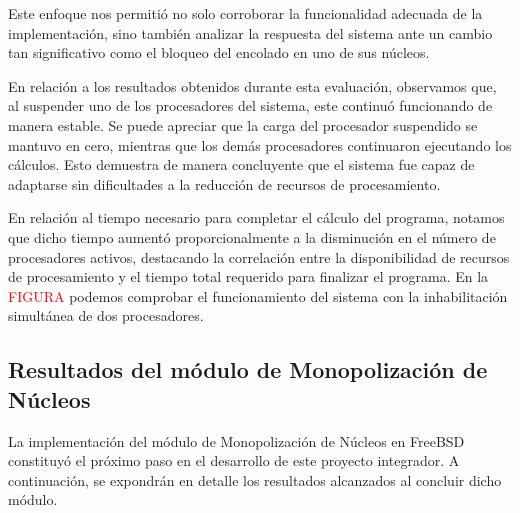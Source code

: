 Este enfoque nos permitió no solo corroborar la funcionalidad adecuada de la implementación, sino también analizar la respuesta del sistema ante un cambio tan significativo como el bloqueo del encolado en uno de sus núcleos.\par

En relación a los resultados obtenidos durante esta evaluación, observamos que, al suspender uno de los procesadores del sistema, este continuó funcionando de manera estable. Se puede apreciar que la carga del procesador suspendido se mantuvo en cero, mientras que los demás procesadores continuaron ejecutando los cálculos. Esto demuestra de manera concluyente que el sistema fue capaz de adaptarse sin dificultades a la reducción de recursos de procesamiento.\par


En relación al tiempo necesario para completar el cálculo del programa, notamos que dicho tiempo aumentó proporcionalmente a la disminución en el número de procesadores activos, destacando la correlación entre la disponibilidad de recursos de procesamiento y el tiempo total requerido para finalizar el programa. En la %
\textcolor{red}{FIGURA} podemos comprobar el funcionamiento del sistema con la inhabilitación simultánea de dos procesadores.\par





\subsection{Resultados del módulo de Monopolización de Núcleos}
La implementación del módulo de Monopolización de Núcleos en FreeBSD constituyó el próximo paso en el desarrollo de este proyecto integrador. A continuación, se expondrán en detalle los resultados alcanzados al concluir dicho módulo.\par
